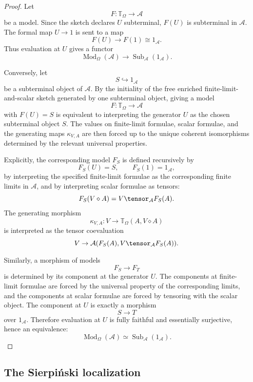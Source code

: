 \begin{proof}
Let
\[
    F:\mathbb T_{\Omega}\to\mathcal A
\]
be a model. Since the sketch declares \(U\) subterminal, \(F(U)\) is subterminal in
\(\mathcal A\). The formal map \(U\to 1\) is sent to a map
\[
    F(U)\to F(1)\cong 1_{\mathcal A}.
\]
Thus evaluation at \(U\) gives a functor
\[
    \operatorname{Mod}_{\Omega}(\mathcal A)
    \longrightarrow
    \operatorname{Sub}_{\mathcal A}(1_{\mathcal A}).
\]

Conversely, let
\[
    S\hookrightarrow 1_{\mathcal A}
\]
be a subterminal object of \(\mathcal A\). By the initiality of the free enriched
finite-limit-and-scalar sketch generated by one subterminal object, giving a model
\[
    F:\mathbb T_{\Omega}\to\mathcal A
\]
with \(F(U)=S\) is equivalent to interpreting the generator \(U\) as the chosen
subterminal object \(S\). The values on finite-limit formulae, scalar formulae, and
the generating maps \(\kappa_{V,A}\) are then forced up to the unique coherent
isomorphisms determined by the relevant universal properties.

Explicitly, the corresponding model \(F_S\) is defined recursively by
\[
    F_S(U)=S,
    \qquad
    F_S(1)=1_{\mathcal A},
\]
by interpreting the specified finite-limit formulae as the corresponding finite
limits in \(\mathcal A\), and by interpreting scalar formulae as tensors:
\[
    F_S(V\diamond A)
    =
    V\tensor_{\mathcal A}F_S(A).
\]
The generating morphism
\[
    \kappa_{V,A}:
    V\to \mathbb T_{\Omega}(A,V\diamond A)
\]
is interpreted as the tensor coevaluation
\[
    V\to
    \mathcal A(F_S(A),V\tensor_{\mathcal A}F_S(A)).
\]

Similarly, a morphism of models
\[
    F_S\to F_T
\]
is determined by its component at the generator \(U\). The components at
finite-limit formulae are forced by the universal property of the corresponding
limits, and the components at scalar formulae are forced by tensoring with the
scalar object. The component at \(U\) is exactly a morphism
\[
    S\to T
\]
over \(1_{\mathcal A}\). Therefore evaluation at \(U\) is fully faithful and
essentially surjective, hence an equivalence:
\[
    \operatorname{Mod}_{\Omega}(\mathcal A)
    \simeq
    \operatorname{Sub}_{\mathcal A}(1_{\mathcal A}).
\]
\end{proof}

\subsection{The Sierpiński localization}
\label{subsec:sierpinski-localization}

